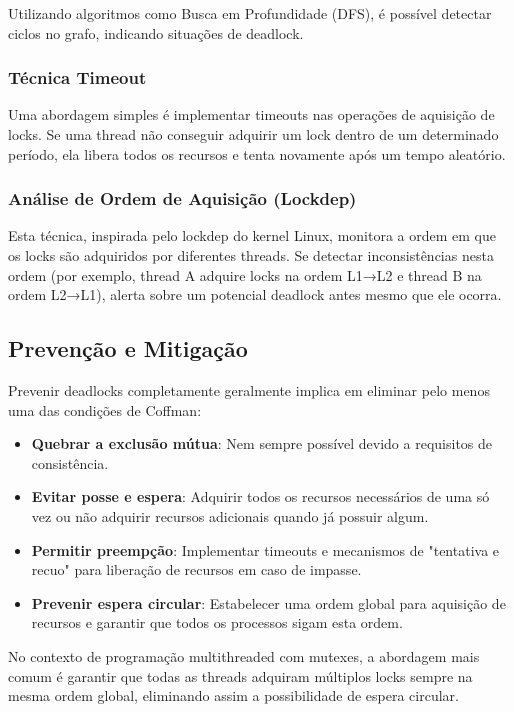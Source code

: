 Utilizando algoritmos como Busca em Profundidade (DFS), é possível detectar ciclos no grafo, indicando situações de deadlock.

\subsubsection{Técnica Timeout}

Uma abordagem simples é implementar timeouts nas operações de aquisição de locks. Se uma thread não conseguir adquirir um lock dentro de um determinado período, ela libera todos os recursos e tenta novamente após um tempo aleatório.

\subsubsection{Análise de Ordem de Aquisição (Lockdep)}

Esta técnica, inspirada pelo lockdep do kernel Linux, monitora a ordem em que os locks são adquiridos por diferentes threads. Se detectar inconsistências nesta ordem (por exemplo, thread A adquire locks na ordem L1→L2 e thread B na ordem L2→L1), alerta sobre um potencial deadlock antes mesmo que ele ocorra.

\subsection{Prevenção e Mitigação}

Prevenir deadlocks completamente geralmente implica em eliminar pelo menos uma das condições de Coffman:

\begin{itemize}
    \item \textbf{Quebrar a exclusão mútua}: Nem sempre possível devido a requisitos de consistência.

    \item \textbf{Evitar posse e espera}: Adquirir todos os recursos necessários de uma só vez ou não adquirir recursos adicionais quando já possuir algum.

    \item \textbf{Permitir preempção}: Implementar timeouts e mecanismos de "tentativa e recuo" para liberação de recursos em caso de impasse.

    \item \textbf{Prevenir espera circular}: Estabelecer uma ordem global para aquisição de recursos e garantir que todos os processos sigam esta ordem.
\end{itemize}

No contexto de programação multithreaded com mutexes, a abordagem mais comum é garantir que todas as threads adquiram múltiplos locks sempre na mesma ordem global, eliminando assim a possibilidade de espera circular.
